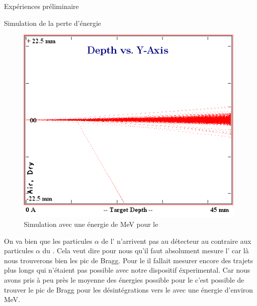 \documentclass[a4paper,11pt]{scrartcl}
\begin{document}
\begin{section}{Expériences préliminaire}
\begin{subsection}{Simulation de la perte d'énergie}
\begin{figure}[H]
\begin{minipage}{0.45\textwidth}
     \includegraphics[width=\textwidth]{Bilder/simbi7MeV.png}
     \caption{Simulation avec une énergie de \unit[7]{MeV} pour le }
    \end{minipage}
   \end{figure}
   On va bien que les particules $\alpha$ de l' n'arrivent pas au détecteur au contraire aux particules $\alpha$ du . Cela veut dire pour nous qu'il faut absolument mesure l' car là nous trouverons bien les pic de Bragg. Pour le  il fallait mesurer encore des trajets plus longs qui n'étaient pas possible avec notre dispositif éxperimental. Car nous avons pris à peu près le moyenne des énergies possible pour le  c'est possible de trouver le pic de Bragg pour les désintégrations vers le  avec une énergie d'environ \unit[6]{MeV}.
  \end{subsection}
 \end{section}
\end{document}
